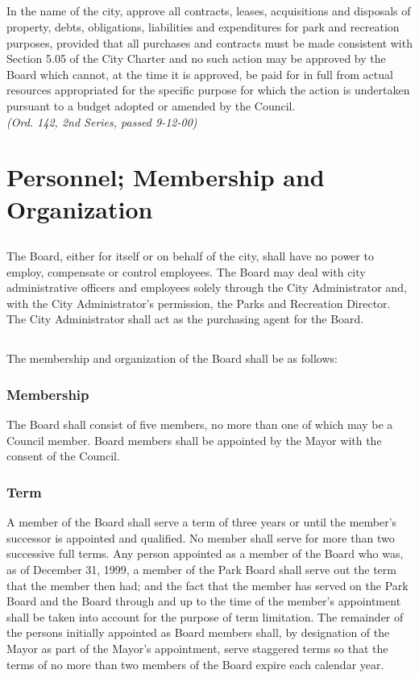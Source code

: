 \subsection{}
In the name of the city, approve all contracts, leases, acquisitions and disposals of property, debts, obligations, liabilities and expenditures for park and recreation purposes, provided that all purchases and contracts must be made consistent with Section 5.05 of the City Charter and no such action may be approved by the Board which cannot, at the time it is approved, be paid for in full from actual resources appropriated for the specific purpose for which the action is undertaken pursuant to a budget adopted or amended by the Council.\\
\emph{(Ord. 142, 2nd Series, passed 9-12-00)}
\section{Personnel; Membership and Organization}
\subsection{}
The Board, either for itself or on behalf of the city, shall have no power to employ, compensate or control employees. The Board may deal with city administrative officers and employees solely through the City Administrator and, with the City Administrator’s permission, the Parks and Recreation Director. The City Administrator shall act as the purchasing agent for the Board.
\subsection{}
The membership and organization of the Board shall be as follows:
\subsubsection{Membership}
The Board shall consist of five members, no more than one of which may be a Council member. Board members shall be appointed by the Mayor with the consent of the Council.
\subsubsection{Term}
A member of the Board shall serve a term of three years or until the member’s successor is appointed and qualified. No member shall serve for more than two successive full terms.  Any person appointed as a member of the Board who was, as of December 31, 1999, a member of the Park Board shall serve out the term that the member then had; and the fact that the member has served on the Park Board and the Board through and up to the time of the member’s appointment shall be taken into account for the purpose of term limitation. The remainder of the persons initially appointed as Board members shall, by designation of the Mayor as part of the Mayor’s appointment, serve staggered terms so that the terms of no more than two members of the Board expire each calendar year.
